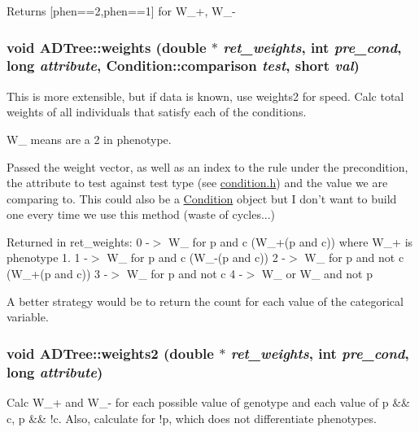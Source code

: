 Returns \mbox{[}phen==2,phen==1\mbox{]} for W\_\-+, W\_\--\/ \hypertarget{classADTree_a726e3f99718496cce2dbcf88c06e6b35}{
\subsubsection[{weights}]{\setlength{\rightskip}{0pt plus 5cm}void ADTree::weights (double $\ast$ {\em ret\_\-weights}, \/  int {\em pre\_\-cond}, \/  long {\em attribute}, \/  {\bf Condition::comparison} {\em test}, \/  short {\em val})}}
\label{classADTree_a726e3f99718496cce2dbcf88c06e6b35}
This is more extensible, but if data is known, use weights2 for speed. Calc total weights of all individuals that satisfy each of the conditions.

W\_ means are a 2 in phenotype.

Passed the weight vector, as well as an index to the rule under the precondition, the attribute to test against test type (see \hyperlink{condition_8h}{condition.h}) and the value we are comparing to. This could also be a \hyperlink{classCondition}{Condition} object but I don't want to build one every time we use this method (waste of cycles...)

Returned in ret\_\-weights: 0 -\/$>$ W\_ for p and c (W\_\-+(p and c)) where W\_\-+ is phenotype 1. 1 -\/$>$ W\_ for p and c (W\_\--\/(p and c)) 2 -\/$>$ W\_ for p and not c (W\_\-+(p and c)) 3 -\/$>$ W\_ for p and not c 4 -\/$>$ W\_ or W\_ and not p

A better strategy would be to return the count for each value of the categorical variable. \hypertarget{classADTree_a75995e4c656f386c74450e7571b0dfcb}{
\subsubsection[{weights2}]{\setlength{\rightskip}{0pt plus 5cm}void ADTree::weights2 (double $\ast$ {\em ret\_\-weights}, \/  int {\em pre\_\-cond}, \/  long {\em attribute})}}
\label{classADTree_a75995e4c656f386c74450e7571b0dfcb}
Calc W\_\-+ and W\_\--\/ for each possible value of genotype and each value of p \&\& c, p \&\& !c. Also, calculate for !p, which does not differentiate phenotypes.


